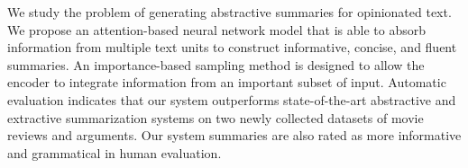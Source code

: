 We study the problem of generating abstractive summaries for opinionated text. We propose an attention-based neural network model that is able to absorb information from multiple text units to construct informative, concise, and fluent summaries. An importance-based sampling method is designed to allow the encoder to integrate information from an important subset of input. Automatic evaluation indicates that our system outperforms state-of-the-art abstractive and extractive summarization systems on two newly collected datasets of movie reviews and arguments. Our system summaries are also rated as more informative and grammatical in human evaluation.
